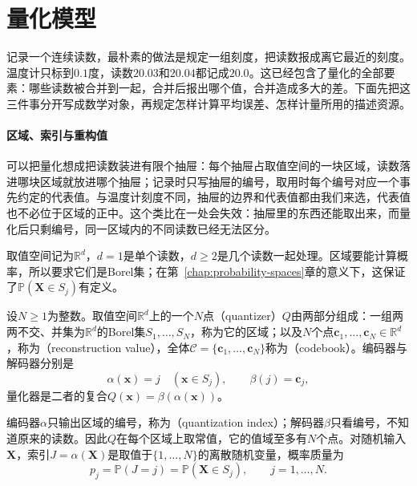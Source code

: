 \section{量化模型}
\label{sec:quant-model}

记录一个连续读数，最朴素的做法是规定一组刻度，把读数报成离它最近的刻度。温度计只标到$0.1$度，读数$20.03$和$20.04$都记成$20.0$。这已经包含了量化的全部要素：哪些读数被合并到一起，合并后报出哪个值，合并造成多大的差。下面先把这三件事分开写成数学对象，再规定怎样计算平均误差、怎样计量所用的描述资源。

\paragraph{区域、索引与重构值}

可以把量化想成把读数装进有限个抽屉：每个抽屉占取值空间的一块区域，读数落进哪块区域就放进哪个抽屉；记录时只写抽屉的编号，取用时每个编号对应一个事先约定的代表值。与温度计刻度不同，抽屉的边界和代表值都由我们来选，代表值也不必位于区域的正中。这个类比在一处会失效：抽屉里的东西还能取出来，而量化后只剩编号，同一区域内的不同读数已经无法区分。

取值空间记为$\mathbb{R}^{d}$，$d=1$是单个读数，$d\geq2$是几个读数一起处理。区域要能计算概率，所以要求它们是Borel集；在第~\ref{chap:probability-spaces}章的意义下，这保证了$\mathbb{P}(\bm{X}\in S_j)$有定义。

\begin{definition}[量化器]
\label{def:quant-quantizer}
设$N\geq1$为整数。取值空间$\mathbb{R}^{d}$上的一个$N$点（quantizer）$Q$由两部分组成：一组两两不交、并集为$\mathbb{R}^{d}$的Borel集$S_1,\dots,S_N$，称为它的区域；以及$N$个点$\bm{c}_1,\dots,\bm{c}_N\in\mathbb{R}^{d}$，称为（reconstruction value），全体$\mathcal{C}=\{\bm{c}_1,\dots,\bm{c}_N\}$称为（codebook）。编码器与解码器分别是
\begin{equation}
 \alpha(\bm{x})=j\quad(\bm{x}\in S_j),\qquad \beta(j)=\bm{c}_j ,
 \label{eq:quant-encoder-decoder}
\end{equation}
量化器是二者的复合$Q(\bm{x})=\beta(\alpha(\bm{x}))$。
\end{definition}

编码器$\alpha$只输出区域的编号，称为（quantization index）；解码器$\beta$只看编号，不知道原来的读数。因此$Q$在每个区域上取常值，它的值域至多有$N$个点。对随机输入$\bm{X}$，索引$J=\alpha(\bm{X})$是取值于$\{1,\dots,N\}$的离散随机变量，概率质量为
\begin{equation}
 p_j=\mathbb{P}(J=j)=\mathbb{P}(\bm{X}\in S_j),\qquad j=1,\dots,N .
 \label{eq:quant-index-pmf}
\end{equation}

